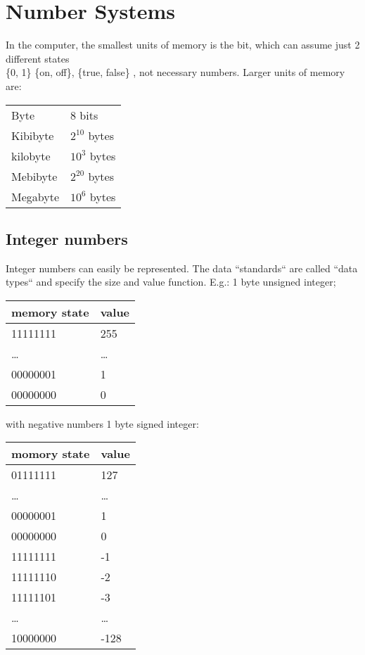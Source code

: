 \chapter{Number Systems}
In the computer, the smallest units of memory is the bit, which can assume
just 2 different states \\
\{0, 1\} \{on, off\}, \{true, false\} , not necessary numbers.
Larger units of memory are:
\begin{center}
    \begin{tabular}{ l l }
        Byte     & 8 bits         \\
        Kibibyte & $2^{10}$ bytes \\
        kilobyte & $10^3$ bytes   \\
        Mebibyte & $2^{20}$ bytes \\
        Megabyte & $10^6$ bytes
    \end{tabular}
\end{center}


\section{Integer numbers}\label{sec:integer-numbers}
Integer numbers can easily be represented.
The data ``standards`` are called ``data types`` and specify the size and value function.
E.g.: 1 byte unsigned integer;
\begin{center}
    \begin{tabular}{ l | l }
        memory state & value  \\
        \hline
        11111111     & 255    \\
        \ldots       & \ldots \\
        00000001     & 1      \\
        00000000     & 0
    \end{tabular}
\end{center}

with negative numbers \textrightarrow{} 1 byte signed integer:
\begin{center}
    \begin{tabular}{ l | l }
        momory state & value  \\
        \hline
        01111111     & 127    \\
        \ldots       & \ldots \\
        00000001     & 1      \\
        00000000     & 0      \\
        11111111     & -1     \\
        11111110     & -2     \\
        11111101     & -3     \\
        \ldots       & \ldots \\
        10000000     & -128
    \end{tabular}
\end{center}


